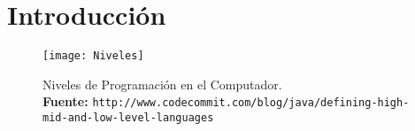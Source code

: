 \chapter{Introducción}
\begin{figure}[h]
\centering
\texttt{[image: Niveles]}
\captionsetup{justification=centering}
\caption[caption]{\footnotesize Niveles de Programación en el Computador. \\ \textbf{Fuente:} \texttt{http://www.codecommit.com/blog/java/defining-high-mid-and-low-level-languages}}
\end{figure}